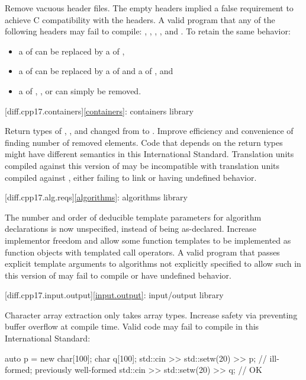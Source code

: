 \change
Remove vacuous \Cpp{} header files.
\rationale
The empty headers implied a false requirement to achieve C compatibility with the \Cpp{} headers.
\effect
A valid \CppXVII{} program that  any of the following headers may fail to compile:
,
,
,
, and
.
To retain the same behavior:
\begin{itemize}
\item
a  of  can be replaced by
a  of ,
\item
a  of  can be replaced by
a  of  and
a  of ,
and
\item
a  of
,
, or
can simply be removed.
\end{itemize}

[diff.cpp17.containers]{\ref{containers}: containers library}

\change
Return types of , , and 
changed from  to .
\rationale
Improve efficiency and convenience of finding number of removed elements.
\effect
Code that depends on the return types might have different semantics in this International Standard.
Translation units compiled against this version of \Cpp{} may be incompatible with
translation units compiled against \CppXVII{}, either failing to link or having undefined behavior.

[diff.cpp17.alg.reqs]{\ref{algorithms}: algorithms library}

\change
The number and order of deducible template parameters for algorithm declarations
is now unspecified, instead of being as-declared.
\rationale
Increase implementor freedom and allow some function templates
to be implemented as function objects with templated call operators.
\effect
A valid \CppXVII{} program that passes explicit template arguments to
algorithms not explicitly specified to allow such in this version of \Cpp{}
may fail to compile or have undefined behavior.

[diff.cpp17.input.output]{\ref{input.output}: input/output library}

\change
Character array extraction only takes array types.
\rationale
Increase safety via preventing buffer overflow at compile time.
\effect
Valid \CppXVII{} code may fail to compile in this International Standard:
\begin{codeblock}
auto p = new char[100];
char q[100];
std::cin >> std::setw(20) >> p;         // ill-formed; previously well-formed
std::cin >> std::setw(20) >> q;         // OK
\end{codeblock}

